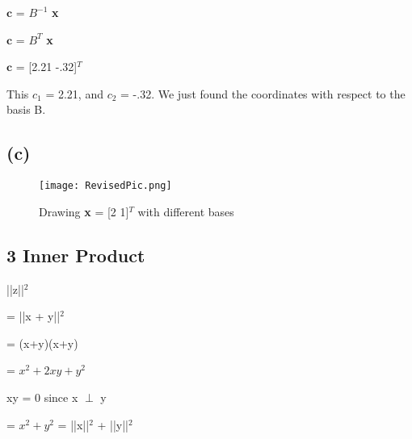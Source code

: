 \documentclass[11pt]{article}
\begin{document}
\begin{center}

$\textbf{c}$ = $B^{-1}$ \textbf{x}

\end{center}
\begin{center}

$\textbf{c}$ = $B^{T}$ \textbf{x}

\end{center}

\begin{center}

$\textbf{c}$ = [2.21 -.32]$^T$

\end{center}



\vspace{3mm}
This $c_1$ = 2.21, and $c_2$ = -.32. We just found the coordinates with respect to the basis B.
\newpage

\subsection*{(c)}



\begin{figure}[h]
\centering
\texttt{[image: RevisedPic.png]}
\caption {Drawing \textbf{x} = [2 1]$^T$ with different bases}
\end{figure}





\vspace{5mm}



\subsection*{3 Inner Product}
\begin{center}

||z||$^2$

\end{center}
\begin{center}

= ||x + y||$^2$

\end{center}
\begin{center}

= (x+y)(x+y)

\end{center}

\begin{center}

= $x^2 + 2xy + y^2$

\end{center}

\begin{center}

xy = 0 since x $\perp$ y

\end{center}

\begin{center}

= $x^2 + y^2$ = ||x||$^2$ + ||y||$^2$

\end{center}
\end{document}
